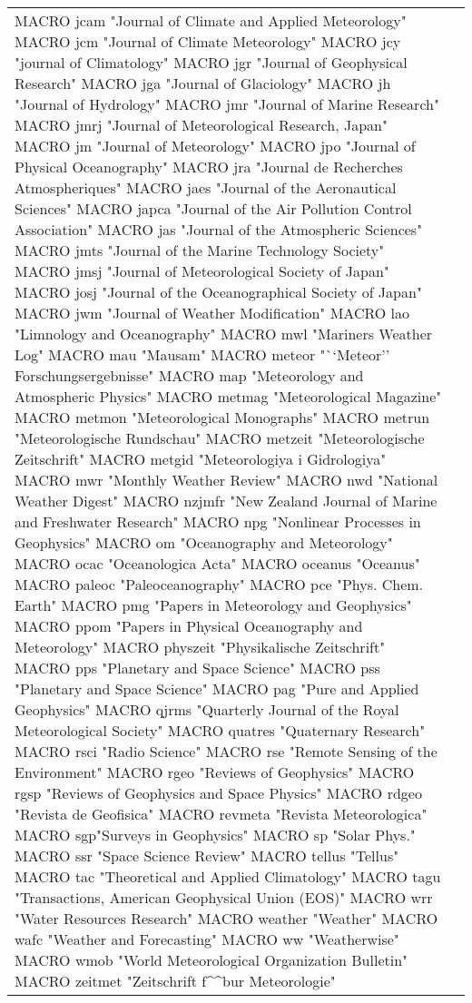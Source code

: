 \documentclass{article}
\begin{document}
\begin{longtable}{lp{6cm}}
MACRO {jcam} {"Journal of Climate and Applied Meteorology"}
MACRO {jcm} {"Journal of Climate Meteorology"}
MACRO {jcy} {"journal of Climatology"}
MACRO {jgr} {"Journal of Geophysical Research"}
MACRO {jga} {"Journal of Glaciology"}
MACRO {jh} {"Journal of Hydrology"}
MACRO {jmr} {"Journal of Marine Research"}
MACRO {jmrj} {"Journal of Meteorological Research, Japan"}
MACRO {jm} {"Journal of Meteorology"}
MACRO {jpo} {"Journal of Physical Oceanography"}
MACRO {jra} {"Journal de Recherches Atmospheriques"}
MACRO {jaes} {"Journal of the Aeronautical Sciences"}
MACRO {japca} {"Journal of the Air Pollution Control Association"}
MACRO {jas} {"Journal of the Atmospheric Sciences"}
MACRO {jmts} {"Journal of the Marine Technology Society"}
MACRO {jmsj} {"Journal of Meteorological Society of Japan"}
MACRO {josj} {"Journal of the Oceanographical Society of Japan"}
MACRO {jwm} {"Journal of Weather Modification"}
MACRO {lao} {"Limnology and Oceanography"}
MACRO {mwl} {"Mariners Weather Log"}
MACRO {mau} {"Mausam"}
MACRO {meteor} {"``Meteor'' Forschungsergebnisse"}
MACRO {map} {"Meteorology and Atmospheric Physics"}
MACRO {metmag} {"Meteorological Magazine"}
MACRO {metmon} {"Meteorological Monographs"}
MACRO {metrun} {"Meteorologische Rundschau"}
MACRO {metzeit} {"Meteorologische Zeitschrift"}
MACRO {metgid} {"Meteorologiya i Gidrologiya"}
MACRO {mwr} {"Monthly Weather Review"}
MACRO {nwd} {"National Weather Digest"}
MACRO {nzjmfr} {"New Zealand Journal of Marine and Freshwater Research"}
MACRO {npg} {"Nonlinear Processes in Geophysics"}
MACRO {om} {"Oceanography and Meteorology"}
MACRO {ocac} {"Oceanologica Acta"}
MACRO {oceanus} {"Oceanus"}
MACRO {paleoc} {"Paleoceanography"}
MACRO {pce} {"Phys. Chem. Earth"}
MACRO {pmg} {"Papers in Meteorology and Geophysics"}
MACRO {ppom} {"Papers in Physical Oceanography and Meteorology"}
MACRO {physzeit} {"Physikalische Zeitschrift"}
MACRO {pps} {"Planetary and Space Science"}
MACRO {pss} {"Planetary and Space Science"}
MACRO {pag} {"Pure and Applied Geophysics"}
MACRO {qjrms} {"Quarterly Journal of the Royal Meteorological Society"}
MACRO {quatres} {"Quaternary Research"}
MACRO {rsci} {"Radio Science"}
MACRO {rse} {"Remote Sensing of the Environment"}
MACRO {rgeo} {"Reviews of Geophysics"}
MACRO {rgsp} {"Reviews of Geophysics and Space Physics"}
MACRO {rdgeo} {"Revista de Geofisica"}
MACRO {revmeta} {"Revista Meteorologica"}
MACRO {sgp}{"Surveys in Geophysics"}
MACRO {sp} {"Solar Phys."}
MACRO {ssr} {"Space Science Review"}
MACRO {tellus} {"Tellus"}
MACRO {tac} {"Theoretical and Applied Climatology"}
MACRO {tagu} {"Transactions, American Geophysical Union (EOS)"}
MACRO {wrr} {"Water Resources Research"}
MACRO {weather} {"Weather"}
MACRO {wafc} {"Weather and Forecasting"}
MACRO {ww} {"Weatherwise"}
MACRO {wmob} {"World Meteorological Organization Bulletin"}
MACRO {zeitmet} {"Zeitschrift f\^^b{u}r Meteorologie"}


\end{longtable}
\end{document}
